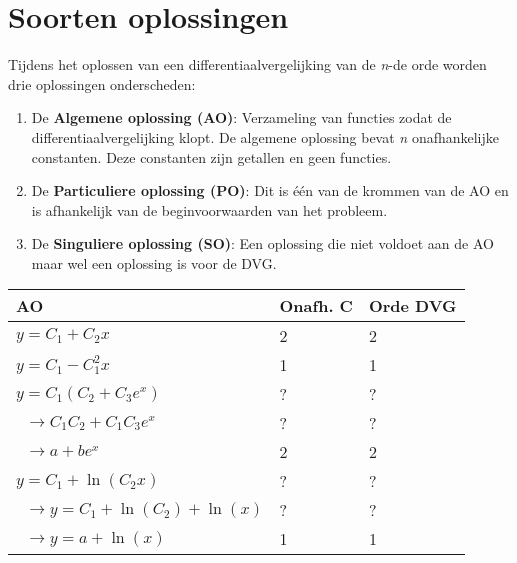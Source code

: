 \section{Soorten oplossingen}
Tijdens het oplossen van een differentiaalvergelijking van de \textit{n}-de orde worden drie oplossingen onderscheden:
\begin{enumerate}
\item De \textbf{Algemene oplossing (AO)}: Verzameling van functies zodat de differentiaalvergelijking klopt. De algemene oplossing bevat \textit{n }onafhankelijke constanten. Deze constanten zijn getallen en geen functies.
\item De \textbf{Particuliere oplossing (PO)}: Dit is één van de krommen van de AO en is afhankelijk van de beginvoorwaarden van het probleem.
\item De \textbf{Singuliere oplossing (SO)}: Een oplossing die niet voldoet aan de AO maar wel een oplossing is voor de DVG.
\end{enumerate}
{
\begin{center}
    \begin{tabular}{l | l | l}
    AO & Onafh. C & Orde DVG \\
    \hline
    $y = C_1 + C_2x$ & 2 & 2 \\
    $y = C_1  - C_1^2x$ & 1 & 1 \\
    \hline
    $y = C_1(C_2 + C_3e^x)$ & ? & ? \\
    $\;\;\rightarrow C_1C_2 + C_1C_3e^x$ & ? & ? \\
    $\;\;\rightarrow a + be^x$ & 2 & 2 \\
    \hline
    $y = C_1 + \ln(C_2 x)$ & ? & ? \\
    $\;\;\rightarrow y = C_1 + \ln(C_2) + \ln(x)$ & ? & ? \\
    $\;\;\rightarrow y = a + \ln(x)$ & 1 & 1


    \end{tabular}
\end{center}
}
